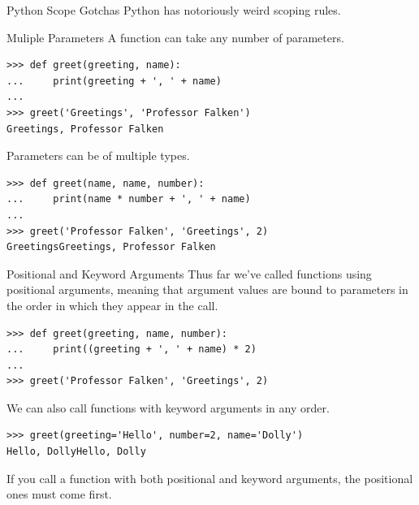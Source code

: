 \documentclass[smaller, aspectratio=1610]{beamer}
\begin{document}
\begin{frame}[label={sec:org9e3176c}]{Python Scope Gotchas}
Python has notoriously weird scoping rules.
\end{frame}

\begin{frame}[label={sec:org197a35e},fragile]{Muliple Parameters}
 A function can take any number of parameters.

\lstset{language=Python,label= ,caption= ,captionpos=b,numbers=none}
\begin{lstlisting}
>>> def greet(greeting, name):
...     print(greeting + ', ' + name)
...
>>> greet('Greetings', 'Professor Falken')
Greetings, Professor Falken
\end{lstlisting}

Parameters can be of multiple types.

\lstset{language=Python,label= ,caption= ,captionpos=b,numbers=none}
\begin{lstlisting}
>>> def greet(name, name, number):
...     print(name * number + ', ' + name)
...
>>> greet('Professor Falken', 'Greetings', 2)
GreetingsGreetings, Professor Falken
\end{lstlisting}
\end{frame}

\begin{frame}[label={sec:org7ee81fe},fragile]{Positional and Keyword Arguments}
 Thus far we've called functions using positional arguments, meaning that argument values are bound to parameters in the order in which they appear in the call.

\lstset{language=Python,label= ,caption= ,captionpos=b,numbers=none}
\begin{lstlisting}
>>> def greet(greeting, name, number):
...     print((greeting + ', ' + name) * 2)
...
>>> greet('Professor Falken', 'Greetings', 2)
\end{lstlisting}

We can also call functions with keyword arguments in any order.

\lstset{language=Python,label= ,caption= ,captionpos=b,numbers=none}
\begin{lstlisting}
>>> greet(greeting='Hello', number=2, name='Dolly')
Hello, DollyHello, Dolly
\end{lstlisting}

If you call a function with both positional and keyword arguments, the positional ones must come first.
\end{frame}
\end{document}
